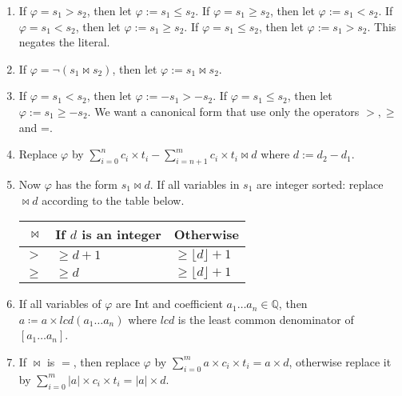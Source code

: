 \begin{enumerate}
    \item If $\varphi = s_1 > s_2$, then let $\varphi := s_1 \leq s_2$.
      If $\varphi = s_1 \geq s_2$, then let $\varphi := s_1 < s_2$.
      If $\varphi = s_1 < s_2$, then let $\varphi := s_1 \geq s_2$.
      If $\varphi = s_1 \leq s_2$, then let $\varphi := s_1 > s_2$. This negates
      the literal.
    
    \item If $\varphi = \neg (s_1 \bowtie s_2)$, then let $\varphi := s_1 \bowtie s_2$.
    
    \item If $\varphi = s_1 < s_2$, then let $\varphi :=   - s_1 > - s_2$.
      If $\varphi = s_1 \leq s_2$, then let $\varphi :=  s_1 \geq - s_2$.
      We want a canonical form that use only the operators $>, \geq$ and =.

    \item Replace $\varphi$ by $\sum_{i=0}^{n}c_i\times{}t_i - \sum_{i=n+1}^{m} c_i\times{}t_i
    \bowtie d$ where $d := d_2 - d_1$.
    
    \item \label{la_generic:str}Now $\varphi$ has the form $s_1 \bowtie d$. If all
    variables in $s_1$ are integer sorted: replace $\bowtie d$ according to
    the table below.

    \begin{center}
    \begin{tabular}{r|l|l}
        $\bowtie$  & If $d$ is an integer  & Otherwise \\
        \hline
        $>$        & $\geq d + 1$  & $\geq \lfloor d\rfloor + 1$  \\
        $\geq$     & $\geq d$      & $\geq \lfloor d\rfloor + 1$  \\
    \end{tabular}
    \end{center}

    \item If all variables of $\varphi$ are Int and coefficient $a_1 \dots a_n \in \mathbb{Q}$,
    then $a \coloneq a \times lcd(a_1 \dots a_n)$ where $lcd$ is the least common denominator of $[a_1 \dots a_n]$.
    
    \item If $\bowtie$ is $=$, then replace $\varphi$ by
    $\sum_{i=0}^{m}a\times{}c_i\times{}t_i = a\times{}d$, otherwise replace it by
    $\sum_{i=0}^{m}|a|\times{}c_i\times{}t_i = |a|\times{}d$. 
\end{enumerate}


